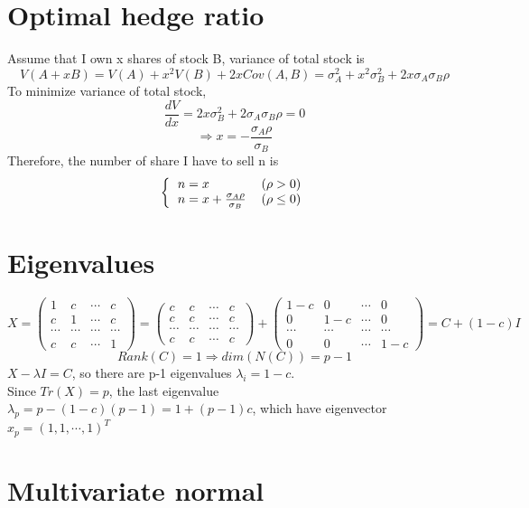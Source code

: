 \documentclass{article}
\begin{document}
\section{Optimal hedge ratio}
Assume that I own x shares of stock B, variance of total stock is
\[V(A+xB) = V(A) + x^2V(B) + 2xCov(A, B) = \sigma_A^2 + x^2\sigma_B^2 + 2x\sigma_A\sigma_B\rho\]
To minimize variance of total stock,
\[\frac{dV}{dx} = 2x\sigma_B^2 + 2\sigma_A\sigma_B\rho = 0\]
\[\Rightarrow x = -\frac{\sigma_A\rho}{\sigma_B}\]
Therefore, the number of share I have to sell n is
\[\bigg\{
\begin{tabular}{l r}
$n = x$ & $(\rho > 0)$ \\
$n = x + \frac{\sigma_A\rho}{\sigma_B}$ & $(\rho \leq 0)$
\end{tabular}\]

\section{Eigenvalues}

\[X = 
\begin{pmatrix}
1 & c & \cdots & c \\
c & 1 & \cdots & c \\
\cdots & \cdots & \cdots & \cdots \\
c & c & \cdots & 1
\end{pmatrix} = 
\begin{pmatrix}
c & c & \cdots & c \\
c & c & \cdots & c \\
\cdots & \cdots & \cdots & \cdots \\
c & c & \cdots & c
\end{pmatrix} +
\begin{pmatrix}
1-c & 0 & \cdots & 0 \\
0 & 1-c & \cdots & 0 \\
\cdots & \cdots & \cdots & \cdots \\
0 & 0 & \cdots & 1-c
\end{pmatrix} = C + (1-c)I\]
\[Rank(C) = 1 \Rightarrow dim(N(C)) = p-1\]
$ X-\lambda I = C$, so there are p-1 eigenvalues $\lambda_i = 1-c$.\\
Since $Tr(X) = p$, the last  eigenvalue $\lambda_p = p - (1-c)(p-1) = 1 + (p-1)c$, which have eigenvector $x_p = (1, 1, \cdots , 1)^T$

\section{Multivariate normal}
\end{document}
